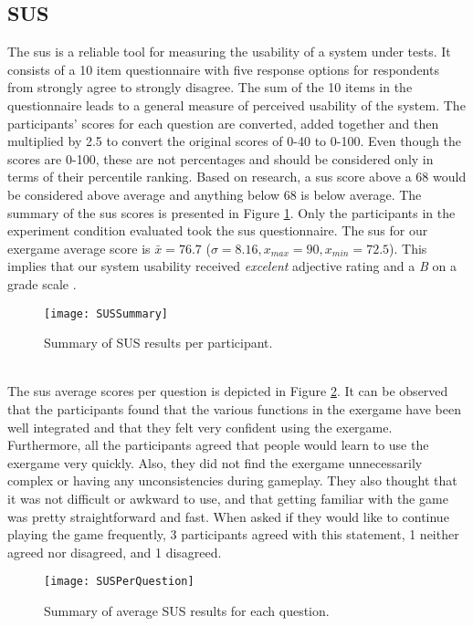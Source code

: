 \subsection{SUS}
The \acrlong{sus} is a reliable tool for measuring the usability of a system under tests. It consists of a 10 item questionnaire with five response options for respondents from strongly agree to strongly disagree. The sum of the 10 items in the questionnaire leads to a general measure of perceived usability of the system. The participants' scores for each question are converted, added together and then multiplied by 2.5 to convert the original scores of 0-40 to 0-100. Even though the scores are 0-100, these are not percentages and should be considered only in terms of their percentile ranking. Based on research, a  \acrshort{sus} score above a 68 would be considered above average and anything below 68 is below average. The summary of the \acrshort{sus} scores is presented in Figure \ref{fig:sus}. Only the participants in the experiment condition evaluated took the \acrshort{sus} questionnaire. The \acrshort{sus} for our exergame average score is \begin{math}\bar{x} = 76.7 \end{math} (\begin{math} \sigma = 8.16, x_{max}= 90, x_{min}= 72.5\end{math}). This implies that our system usability received \textit{excelent} adjective rating and a \textit{B} on a grade scale \cite{brooke2013sus}. 
\begin{figure}[h]
    \centering
    \texttt{[image: SUSSummary]}
    \caption{Summary of SUS results per participant.}
    \label{fig:sus}
\end{figure}\\
The \acrshort{sus} average scores per question is depicted in Figure \ref{fig:susPerQuestion}. It can be observed that the participants found that the various functions in the exergame have been well integrated and that they felt very confident using the exergame. Furthermore, all the participants agreed that people would learn to use the exergame very quickly. Also, they did not find the exergame unnecessarily complex or having any unconsistencies during gameplay. They also thought that it was not difficult or awkward to use, and that getting familiar with the game was pretty straightforward and fast. When asked if they would like to continue playing the game frequently, 3 participants agreed with this statement, 1  neither agreed nor disagreed, and 1 disagreed. 
\begin{figure}[h]
    \centering
    \texttt{[image: SUSPerQuestion]}
    \caption{Summary of average SUS results for each question.}
    \label{fig:susPerQuestion}
\end{figure}\pagebreak
